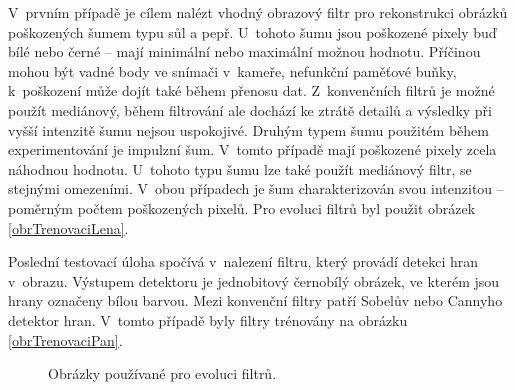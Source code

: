 V~prvním případě je cílem nalézt vhodný obrazový filtr pro rekonstrukci obrázků poškozených šumem typu sůl a pepř. U~tohoto šumu jsou poškozené pixely buď bílé nebo černé -- mají minimální nebo maximální možnou hodnotu. Příčinou mohou být vadné body ve snímači v~kameře, nefunkční paměťové buňky, k~poškození může dojít také během přenosu dat. Z~konvenčních filtrů je možné použít mediánový, během filtrování ale dochází ke ztrátě detailů a výsledky při vyšší intenzitě šumu nejsou uspokojivé. Druhým typem šumu použitém během experimentování je impulzní šum. V~tomto případě mají poškozené pixely zcela náhodnou hodnotu. U~tohoto typu šumu lze také použít mediánový filtr, se stejnými omezeními. V~obou případech je šum charakterizován svou intenzitou -- poměrným počtem poškozených pixelů. Pro evoluci filtrů byl použit obrázek \ref{obrTrenovaciLena}.

Poslední testovací úloha spočívá v~nalezení filtru, který provádí detekci hran v~obrazu. Výstupem detektoru je jednobitový černobílý obrázek, ve kterém jsou hrany označeny bílou barvou. Mezi konvenční filtry patří Sobelův nebo Cannyho detektor hran. V~tomto případě byly filtry trénovány na obrázku \ref{obrTrenovaciPan}.

\begin{figure}[htb]
    \centering
    \hskip1.5cm
    \caption{Obrázky používané pro evoluci filtrů.}
    \label{obrTrenovaci}
\end{figure}

